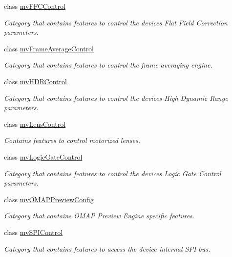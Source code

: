 \begin{DoxyCompactItemize}
class \hyperlink{classmv_i_m_p_a_c_t_1_1acquire_1_1_gen_i_cam_1_1mv_f_f_c_control}{mv\+F\+F\+C\+Control}
\begin{DoxyCompactList}\small\item\em Category that contains features to control the devices Flat Field Correction parameters. \end{DoxyCompactList}\item 
class \hyperlink{classmv_i_m_p_a_c_t_1_1acquire_1_1_gen_i_cam_1_1mv_frame_average_control}{mv\+Frame\+Average\+Control}
\begin{DoxyCompactList}\small\item\em Category that contains features to control the frame averaging engine. \end{DoxyCompactList}\item 
class \hyperlink{classmv_i_m_p_a_c_t_1_1acquire_1_1_gen_i_cam_1_1mv_h_d_r_control}{mv\+H\+D\+R\+Control}
\begin{DoxyCompactList}\small\item\em Category that contains features to control the devices High Dynamic Range parameters. \end{DoxyCompactList}\item 
class \hyperlink{classmv_i_m_p_a_c_t_1_1acquire_1_1_gen_i_cam_1_1mv_lens_control}{mv\+Lens\+Control}
\begin{DoxyCompactList}\small\item\em Contains features to control motorized lenses. \end{DoxyCompactList}\item 
class \hyperlink{classmv_i_m_p_a_c_t_1_1acquire_1_1_gen_i_cam_1_1mv_logic_gate_control}{mv\+Logic\+Gate\+Control}
\begin{DoxyCompactList}\small\item\em Category that contains features to control the devices Logic Gate Control parameters. \end{DoxyCompactList}\item 
class \hyperlink{classmv_i_m_p_a_c_t_1_1acquire_1_1_gen_i_cam_1_1mv_o_m_a_p_preview_config}{mv\+O\+M\+A\+P\+Preview\+Config}
\begin{DoxyCompactList}\small\item\em Category that contains O\+M\+A\+P Preview Engine specific features. \end{DoxyCompactList}\item 
class \hyperlink{classmv_i_m_p_a_c_t_1_1acquire_1_1_gen_i_cam_1_1mv_s_p_i_control}{mv\+S\+P\+I\+Control}
\begin{DoxyCompactList}\small\item\em Category that contains features to access the device internal S\+P\+I bus. \end{DoxyCompactList}\item 

\end{DoxyCompactItemize}
